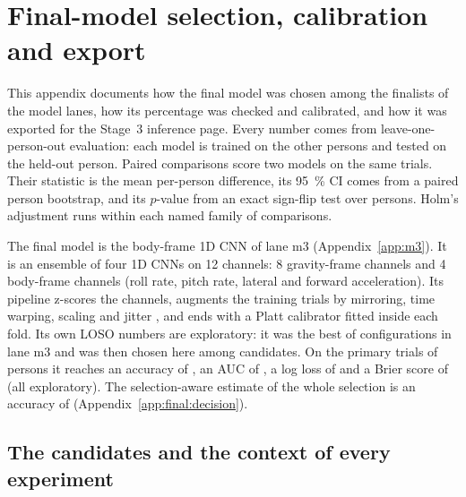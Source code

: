 \section{Final-model selection, calibration and export}\label{app:final}

This appendix documents how the final model was chosen among the finalists of the model lanes, how its percentage \pright{} was checked and calibrated, and how it was exported for the Stage~3 inference page.
Every number comes from leave-one-person-out evaluation: each model is trained on the other persons and tested on the held-out person.
Paired comparisons score two models on the same trials.
Their statistic is the mean per-person difference, its 95~\% CI comes from a paired person bootstrap, and its $p$-value from an exact sign-flip test over persons.
Holm's adjustment runs within each named family of comparisons.

The final model is the body-frame 1D CNN of lane m3 (Appendix~\ref{app:m3}).
It is an ensemble of four 1D CNNs on 12 channels: 8 gravity-frame channels and 4 body-frame channels (roll rate, pitch rate, lateral and forward acceleration).
Its pipeline z-scores the channels, augments the training trials by mirroring, time warping, scaling and jitter \cite{um2017augmentation}, and ends with a Platt calibrator \cite{platt1999probabilistic} fitted inside each fold.
Its own LOSO numbers are exploratory: it was the best of  configurations in lane m3 and was then chosen here among  candidates.
On the  primary trials of  persons it reaches an accuracy of , an AUC of , a log loss of  and a Brier score \cite{brier1950verification} of  (all exploratory).
The selection-aware estimate of the whole selection is an accuracy of  (Appendix~\ref{app:final:decision}).

\subsection{The candidates and the context of every experiment}\label{app:final:candidates}

